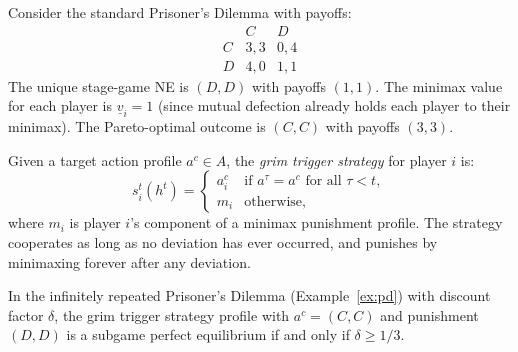 \documentclass[11pt,a4paper]{article}
\begin{document}
\begin{example}
\label{ex:pd}
Consider the standard Prisoner's Dilemma with payoffs:
\[
\begin{array}{c|cc}
  & C & D \\ \hline
C & 3,3 & 0,4 \\
D & 4,0 & 1,1
\end{array}
\]
The unique stage-game NE is $(D,D)$ with payoffs $(1,1)$. The minimax value
for each player is $\underline{v}_i = 1$ (since mutual defection already
holds each player to their minimax). The Pareto-optimal outcome is $(C,C)$
with payoffs $(3,3)$.
\end{example}

\begin{definition}
\label{def:grim-trigger}
Given a target action profile $a^c \in A$, the \emph{grim trigger strategy}
for player $i$ is:
\[
    s_i^t(h^t) = \begin{cases}
        a_i^c & \text{if } a^{\tau} = a^c
            \text{ for all } \tau < t, \\
        m_i   & \text{otherwise},
    \end{cases}
\]
where $m_i$ is player $i$'s component of a minimax punishment profile. The
strategy cooperates as long as no deviation has ever occurred, and punishes
by minimaxing forever after any deviation.
\end{definition}

\begin{proposition}
\label{prop:grim-trigger-pd}
In the infinitely repeated Prisoner's Dilemma
(Example~\ref{ex:pd}) with discount factor $\delta$, the grim trigger
strategy profile with $a^c = (C,C)$ and punishment $(D,D)$ is a subgame
perfect equilibrium if and only if $\delta \geq 1/3$.
\end{proposition}
\end{document}
